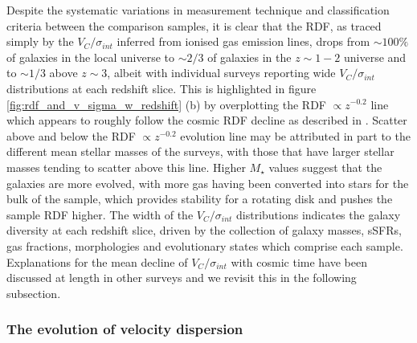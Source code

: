 \documentclass[fleqn,usenatbib]{mn2e}
\begin{document}
Despite the systematic variations in measurement technique and classification criteria between the comparison samples, it is clear that the RDF, as traced simply by the $V_{C}/\sigma_{int}$ inferred from ionised gas emission lines, drops from $\sim 100\%$ of galaxies in the local universe to $\sim 2/3$ of galaxies in the $z \sim 1-2$ universe and to $\sim 1/3$ above $z \sim 3$, albeit with individual surveys reporting wide $V_{C}/\sigma_{int}$ distributions at each redshift slice.
This is highlighted in figure \ref{fig:rdf_and_v_sigma_w_redshift} (b) by overplotting the RDF $\propto z^{-0.2}$ line which appears to roughly follow the cosmic RDF decline as described in \cite{Stott2016}. 
Scatter above and below the RDF $\propto z^{-0.2}$ evolution line may be attributed in part to the different mean stellar masses of the surveys, with those that have larger stellar masses tending to scatter above this line.
Higher $M_{\star}$ values suggest that the galaxies are more evolved, with more gas having been converted into stars for the bulk of the sample, which provides stability for a rotating disk and pushes the sample RDF higher.
The width of the $V_{C}/\sigma_{int}$ distributions indicates the galaxy diversity at each redshift slice, driven by the collection of galaxy masses, sSFRs, gas fractions, morphologies and evolutionary states which comprise each sample.
Explanations for the mean decline of $V_{C}/\sigma_{int}$ with cosmic time have been discussed at length in other surveys \citep[e.g][]{ForsterSchreiber2009,Law2009,Wisnioski2015} and we revisit this in the following subsection.

\subsubsection{The evolution of velocity dispersion}\label{subsubsec:sigma_evolution}
\end{document}
